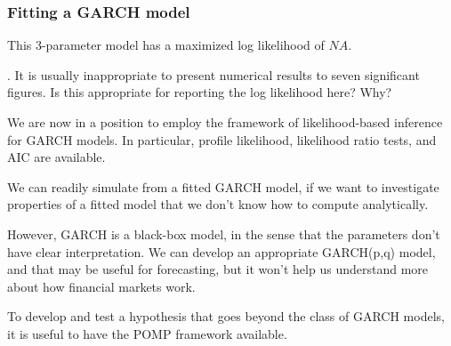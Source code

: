 \documentclass{beamer}
\newcommand\answer[2]{#1} %
\begin{document}
\begin{frame}[fragile]

\frametitle{Fitting a GARCH model}

\begin{knitrout}\small
{}\color{fgcolor}\begin{kframe}
\begin{alltt}
 \hlkwb{<-}  \hlstd{=} \hlstd{,}  \hlstd{=} \hlstd{)}
 \hlkwb{<-} 
\end{alltt}
\end{kframe}
\end{knitrout}

\bi

\item This 3-parameter model has a maximized log likelihood of $NA$.

\ei

\myquestion. It is usually inappropriate to present numerical results to seven significant figures. Is this appropriate for reporting the log likelihood here? Why?

\answer{\vspace{10mm}}{todo}

\end{frame}

\begin{frame}[fragile]

\bi

\item We are now in a position to employ the framework of likelihood-based inference for GARCH models. In particular, profile likelihood, likelihood ratio tests, and AIC are available.

\item We can readily simulate from a fitted GARCH model, if we want to investigate properties of a fitted model that we don't know how to compute analytically.

\item However, GARCH is a black-box model, in the sense that the parameters don't have clear interpretation. We can develop an appropriate GARCH(p,q) model, and that may be useful for forecasting, but it won't help us understand more about how financial markets work. 

\item To develop and test a hypothesis that goes beyond the class of GARCH models, it is useful to have the POMP framework available.

\ei

\end{frame}
\end{document}
